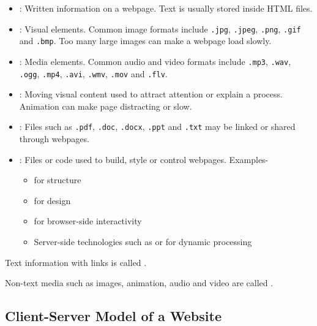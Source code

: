 \begin{itemize}
    \item {}: Written information on a webpage. Text is usually stored inside HTML files.
    \item {}: Visual elements. Common image formats include \texttt{.jpg}, \texttt{.jpeg}, \texttt{.png}, \texttt{.gif} and \texttt{.bmp}. Too many large images can make a webpage load slowly.
    \item {}: Media elements. Common audio and video formats include \texttt{.mp3}, \texttt{.wav}, \texttt{.ogg}, \texttt{.mp4}, \texttt{.avi}, \texttt{.wmv}, \texttt{.mov} and \texttt{.flv}.
    \item {}: Moving visual content used to attract attention or explain a process. Animation can make page distracting or slow. 
    \item {}: Files such as \texttt{.pdf}, \texttt{.doc}, \texttt{.docx}, \texttt{.ppt} and \texttt{.txt} may be linked or shared through webpages.
    \item {}: Files or code used to build, style or control webpages. Examples-
        \begin{itemize}
            \item {} for structure
            \item {} for design
            \item {} for browser-side interactivity
            \item Server-side technologies such as  or  for dynamic processing
        \end{itemize}
\end{itemize}

\begin{definitionbox}[Hypertext]
Text information with links is called .
\end{definitionbox}

\begin{definitionbox}[Hypermedia]
Non-text media such as images, animation, audio and video are called .
\end{definitionbox}

\subsection{Client-Server Model of a Website}

